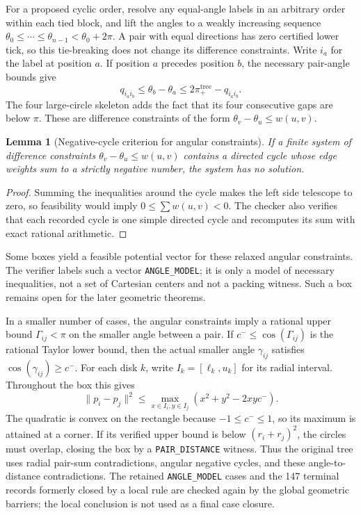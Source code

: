 \documentclass[11pt,a4paper]{article}
\newtheorem{lemma}[theorem]{Lemma}
\theoremstyle{remark}
\newcommand{\norm}[1]{\lVert #1\rVert}
\begin{document}
For a proposed cyclic order, resolve any equal-angle labels in an arbitrary
order within each tied block, and lift the angles to a weakly increasing
sequence $\theta_0\le\cdots\le\theta_{n-1}<\theta_0+2\pi$.  A pair with
equal directions has zero certified lower tick, so this tie-breaking does
not change its difference constraints.  Write $i_a$ for the label at
position $a$.  If position $a$ precedes position $b$, the necessary
pair-angle bounds give
\[
  q_{i_a i_b}\le\theta_b-\theta_a
      \le2\pi_+^{\mathrm{tree}}-q_{i_a i_b}.
\]
The four large-circle skeleton adds the fact that its four consecutive gaps
are below $\pi$.  These are difference constraints of the form
$\theta_v-\theta_u\le w(u,v)$.

\begin{lemma}[Negative-cycle criterion for angular constraints]
\label{lem:negative-cycle}
If a finite system of difference constraints
$\theta_v-\theta_u\le w(u,v)$ contains a directed cycle whose edge weights
sum to a strictly negative number, the system has no solution.
\end{lemma}

\begin{proof}
Summing the inequalities around the cycle makes the left side telescope to
zero, so feasibility would imply $0\le\sum w(u,v)<0$.  The checker also
verifies that each recorded cycle is one simple directed cycle and recomputes
its sum with exact rational arithmetic.
\end{proof}

Some boxes yield a feasible potential vector for these relaxed angular
constraints.  The verifier labels such a vector \texttt{ANGLE\_MODEL}; it is
only a model of necessary inequalities, not a set of Cartesian centers and
not a packing witness.  Such a box remains open for the later geometric
theorems.

In a smaller number of cases, the angular constraints imply a rational upper
bound $\Gamma_{ij}<\pi$ on the smaller angle between a pair.  If
$c^-\le\cos(\Gamma_{ij})$ is the rational Taylor lower bound, then the
actual smaller angle $\gamma_{ij}$ satisfies
$\cos(\gamma_{ij})\ge c^-$.  For each disk $k$, write
$I_k=[\ell_k,u_k]$ for its radial interval.  Throughout the box this gives
\[
  \norm{p_i-p_j}^2
  \le \max_{x\in I_i,y\in I_j}
       (x^2+y^2-2xyc^-).
\]
The quadratic is convex on the rectangle because $-1\le c^-\le1$, so its
maximum is attained at a corner.  If its verified upper bound is below
$(r_i+r_j)^2$, the circles must overlap, closing the box by a
\texttt{PAIR\_DISTANCE} witness.  Thus the original tree uses radial
pair-sum contradictions, angular negative cycles, and these angle-to-distance
contradictions.  The retained \texttt{ANGLE\_MODEL} cases and the
147 terminal records formerly closed by a local rule are checked again by
the global geometric barriers; the local conclusion is not used as a final
case closure.
\end{document}
